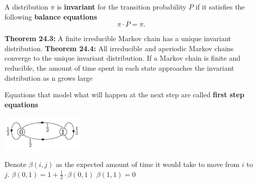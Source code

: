 {\begin{minipage}{16.3cm}
\vspace{1cm}

A distribution $\pi$ is \textbf{invariant} for the transition probability $P$ if it satisfies the following \textbf{balance equations}
\[\pi \cdot P = \pi.\]

\textbf{Theorem 24.3:} A finite irreducible Markov chain has a unique 
invariant distribution.
\textbf{Theorem 24.4:} All irreducible and aperiodic Markov chains 
converge to the unique invariant distribution. If a Markov chain is 
finite and reducible, the amount of time spent in each state approaches 
the invariant distribution as n grows large

Equations that model what will happen at the next step are called 
\textbf{first step equations}

\vspace{5mm}

\begin{minipage}[b]{0.6\linewidth}
\begin{center}
\includegraphics[width=4cm]{definitions_markov_chain.jpg} 
\end{center}
\end{minipage}%
\hfill
\begin{minipage}[b]{0.4\linewidth}
Denote $\beta(i, j)$ as the expected amount of time it would take to 
move from $i$ to $j$.
$\beta(0, 1) = 1 + \frac{1}{2} \cdot \beta(0, 1)$
$\beta(1, 1) = 0$

\end{minipage}

\end{minipage}}